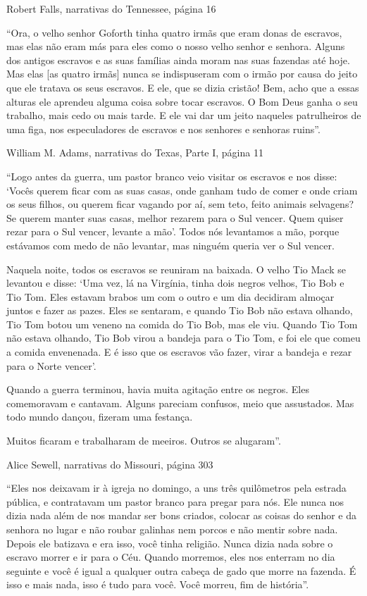 Robert Falls, narrativas do Tennessee, página 16

``Ora, o velho senhor Goforth tinha quatro irmãs que eram donas de
escravos, mas elas não eram más para eles como o nosso velho senhor e
senhora. Alguns dos antigos escravos e as suas famílias ainda moram nas
suas fazendas até hoje. Mas elas {[}as quatro irmãs{]} nunca se
indispuseram com o irmão por causa do jeito que ele tratava os seus
escravos. E ele, que se dizia cristão! Bem, acho que a essas alturas ele
aprendeu alguma coisa sobre tocar escravos. O Bom Deus ganha o seu
trabalho, mais cedo ou mais tarde. E ele vai dar um jeito naqueles
patrulheiros de uma figa, nos especuladores de escravos e nos senhores e
senhoras ruins''.

William M. Adams, narrativas do Texas, Parte I, página 11

``Logo antes da guerra, um pastor branco veio visitar os escravos e nos
disse: `Vocês querem ficar com as suas casas, onde ganham tudo de comer
e onde criam os seus filhos, ou querem ficar vagando por aí, sem teto,
feito animais selvagens? Se querem manter suas casas, melhor rezarem
para o Sul vencer. Quem quiser rezar para o Sul vencer, levante a mão'.
Todos nós levantamos a mão, porque estávamos com medo de não levantar,
mas ninguém queria ver o Sul vencer.

Naquela noite, todos os escravos se reuniram na baixada. O velho Tio
Mack se levantou e disse: `Uma vez, lá na Virgínia, tinha dois negros
velhos, Tio Bob e Tio Tom. Eles estavam brabos um com o outro e um dia
decidiram almoçar juntos e fazer as pazes. Eles se sentaram, e quando
Tio Bob não estava olhando, Tio Tom botou um veneno na comida do Tio
Bob, mas ele viu. Quando Tio Tom não estava olhando, Tio Bob virou a
bandeja para o Tio Tom, e foi ele que comeu a comida envenenada. E é
isso que os escravos vão fazer, virar a bandeja e rezar para o Norte
vencer'.

Quando a guerra terminou, havia muita agitação entre os negros. Eles
comemoravam e cantavam. Alguns pareciam confusos, meio que assustados.
Mas todo mundo dançou, fizeram uma festança.

Muitos ficaram e trabalharam de meeiros. Outros se alugaram''.

Alice Sewell, narrativas do Missouri, página 303

``Eles nos deixavam ir à igreja no domingo, a uns três quilômetros pela
estrada pública, e contratavam um pastor branco para pregar para nós.
Ele nunca nos dizia nada além de nos mandar ser bons criados, colocar as
coisas do senhor e da senhora no lugar e não roubar galinhas nem porcos
e não mentir sobre nada. Depois ele batizava e era isso, você tinha
religião. Nunca dizia nada sobre o escravo morrer e ir para o Céu.
Quando morremos, eles nos enterram no dia seguinte e você é igual a
qualquer outra cabeça de gado que morre na fazenda. É isso e mais nada,
isso é tudo para você. Você morreu, fim de história''.

